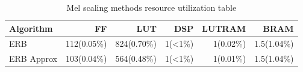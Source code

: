 \begin{table}[H]
    \centering
\begin{tabular}{ !{\color{ytblborder}\vrule}l!{\color{ytblborder}\vrule}rrrrr| } 
    \hline

    \hline
     \color{white}\bf{Algorithm} 
    & \color{white}\bf{FF} 
    & \color{white}\bf{LUT} 
    & \color{white}\bf{DSP} 
    & \color{white}\bf{LUTRAM} 
    & \color{white}\bf{BRAM} \\
    \hline

    \hline
     ERB   & 112(0.05\%) & 824(0.70\%) & 1(<1\%) & 1(0.02\%) & 1.5(1.04\%)  \\
    \hline
    
    \hline
     ERB Approx      & 103(0.04\%) & 564(0.48\%) & 1(<1\%) & 1(0.01\%)  & 1.5(1.04\%)    \\
    \hline

    \hline
\end{tabular}
\caption{Mel scaling methods resource utilization table}
\label{tbl:ERB_resource_util}
\end{table}


